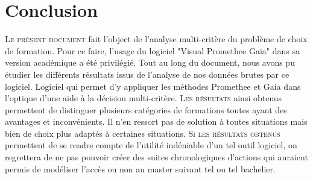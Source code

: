\chapter{Conclusion}\label{chap:conclusion}
\lettrine{L}{e présent document} fait l'object de l'analyse multi-critère du problème de choix de formation. Pour ce faire, l'usage du logiciel "Visual Promethee Gaia" dans sa version académique a été privilégié. Tout au long du document, nous avons pu étudier les différents résultats issus de l'analyse de nos données brutes par ce logiciel. Logiciel qui permet d'y appliquer les méthodes Promethee et Gaia dans l'optique d'une aide à la décision multi-critère.
\lettrine{L}{es résultats} ainsi obtenus permettent de distinguer plusieurs catégories de formations toutes ayant des avantages et inconvénients. Il n'en ressort pas de solution à toutes situations mais bien de choix plus adaptés à certaines situations.
\lettrine{S}{i les résultats obtenus} permettent de se rendre compte de l'utilité indéniable d'un tel outil logiciel, on regrettera de ne pas pouvoir créer des suites chronologiques d'actions qui auraient permis de modéliser l'accès ou non au master suivant tel ou tel bachelier. 
